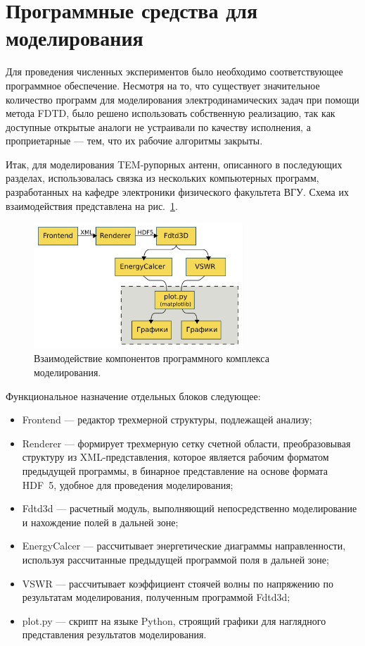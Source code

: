 
\section{Программные средства для моделирования}

Для проведения численных экспериментов было необходимо соответствующее
программное обеспечение. Несмотря на то, что существует значительное количество
программ для моделирования электродинамических задач при помощи метода FDTD,
было решено использовать собственную реализацию, так как доступные открытые
аналоги не устраивали по качеству исполнения, а проприетарные --- тем, что
их рабочие алгоритмы закрыты.

Итак, для моделирования TEM-рупорных антенн, описанного в последующих разделах,
использовалась связка из нескольких компьютерных программ, разработанных на
кафедре электроники физического факультета ВГУ. Схема их взаимодействия
представлена на рис.~\ref{fig:Programs:WorkFlow}.

\begin{figure}[p]
\centering
\includegraphics[width=0.7\textwidth]{graphics/programs-work-flow}
\caption{Взаимодействие компонентов программного комплекса моделирования.}
\label{fig:Programs:WorkFlow}
\end{figure}

Функциональное назначение отдельных блоков следующее:
\begin{itemize}
\item Frontend --- редактор трехмерной структуры, подлежащей анализу;
\item Renderer --- формирует трехмерную сетку счетной области, преобразовывая
      структуру из XML-представления, которое является рабочим форматом
      предыдущей программы, в бинарное представление на основе формата HDF~5,
      удобное для проведения моделирования;
\item Fdtd3d --- расчетный модуль, выполняющий непосредственно моделирование
      и нахождение полей в дальней зоне;
\item EnergyCalcer --- рассчитывает энергетические диаграммы направленности,
      используя рассчитанные предыдущей программой поля в дальней зоне;
\item VSWR --- рассчитывает коэффициент стоячей волны по напряжению по
      результатам моделирования, полученным программой Fdtd3d;
\item plot.py --- скрипт на языке Python, строящий графики для наглядного
      представления результатов моделирования.
\end{itemize}

